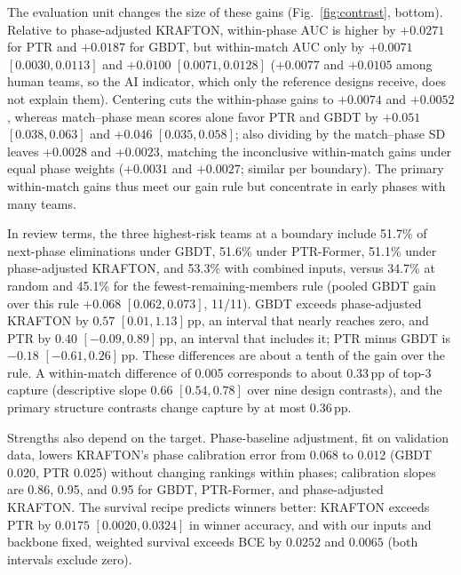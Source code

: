 \documentclass[sigconf,anonymous,nonacm]{acmart}
\begin{document}
The evaluation unit changes the size of these gains (Fig.~\ref{fig:contrast}, bottom). Relative to phase-adjusted KRAFTON, within-phase AUC is higher by $+0.0271$ for PTR and $+0.0187$ for GBDT, but within-match AUC only by $+0.0071$ $[0.0030,\allowbreak 0.0113]$ and $+0.0100$ $[0.0071,\allowbreak 0.0128]$ ($+0.0077$ and $+0.0105$ among human teams, so the AI indicator, which only the reference designs receive, does not explain them). Centering cuts the within-phase gains to $+0.0074$ and $+0.0052$, whereas match--phase mean scores alone favor PTR and GBDT by $+0.051$ $[0.038,\allowbreak 0.063]$ and $+0.046$ $[0.035,\allowbreak 0.058]$; also dividing by the match--phase SD leaves $+0.0028$ and $+0.0023$, matching the inconclusive within-match gains under equal phase weights ($+0.0031$ and $+0.0027$; similar per boundary). The primary within-match gains thus meet our gain rule but concentrate in early phases with many teams.

In review terms, the three highest-risk teams at a boundary include 51.7\% of next-phase eliminations under GBDT, 51.6\% under PTR-Former, 51.1\% under phase-adjusted KRAFTON, and 53.3\% with combined inputs, versus 34.7\% at random and 45.1\% for the fewest-remaining-members rule (pooled GBDT gain over this rule $+0.068$ $[0.062,\allowbreak 0.073]$, 11/11). GBDT exceeds phase-adjusted KRAFTON by $0.57$ $[0.01,\allowbreak 1.13]$\,pp, an interval that nearly reaches zero, and PTR by $0.40$ $[-0.09,\allowbreak 0.89]$\,pp, an interval that includes it; PTR minus GBDT is $-0.18$ $[-0.61,\allowbreak 0.26]$\,pp. These differences are about a tenth of the gain over the rule. A within-match difference of 0.005 corresponds to about 0.33\,pp of top-3 capture (descriptive slope 0.66 $[0.54,\allowbreak 0.78]$ over nine design contrasts), and the primary structure contrasts change capture by at most 0.36\,pp.

Strengths also depend on the target. Phase-baseline adjustment, fit on validation data, lowers KRAFTON's phase calibration error from 0.068 to 0.012 (GBDT 0.020, PTR 0.025) without changing rankings within phases; calibration slopes are 0.86, 0.95, and 0.95 for GBDT, PTR-Former, and phase-adjusted KRAFTON. The survival recipe predicts winners better: KRAFTON exceeds PTR by $0.0175$ $[0.0020,\allowbreak 0.0324]$ in winner accuracy, and with our inputs and backbone fixed, weighted survival exceeds BCE by $0.0252$ and $0.0065$ (both intervals exclude zero).


\end{document}

